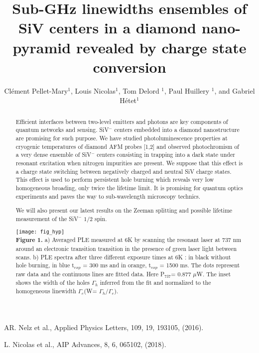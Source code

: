 \documentclass[aps,twocolumn,showpacs]{revtex4-1}
\begin{document}
\title{Sub-GHz linewidths ensembles of SiV centers in a diamond nano-pyramid revealed by charge state conversion}

\author{Cl{\'e}ment Pellet-Mary$^1$, Louis Nicolas$^1$, Tom Delord $^1$, Paul Huillery $^1$, and Gabriel H{\'e}tet$^{1}$}

\begin{abstract}
\normalsize
\noindent
Efficient interfaces between two-level emitters and photons are key components of quantum networks and sensing. %
SiV$^-$ centers embedded into a diamond nanostructure are promising for such purpose. We have studied photoluminescence properties at cryogenic temperatures of diamond AFM probes [1,2] and observed photochromism of a very dense ensemble of SiV$^-$ centers consisting in trapping into a dark state under resonant excitation when nitrogen impurities are present. We suppose that this effect is a charge state switching between negatively charged and neutral SiV charge states.  This effect is used to perform persistent hole burning which reveals very low homogeneous broading, only twice the lifetime limit. It is promising  for quantum optics experiments and paves the way to sub-wavelength microscopy technics. %

We will also present our latest results on the Zeeman splitting and possible lifetime measurement of the SiV$^-$ $1/2$ spin.

\texttt{[image: fig\_hyp]}\\
\noindent\textbf{Figure 1.} a) Averaged PLE measured at 6K by scanning the resonant laser at 737 nm around an electronic transition transition in the presence of green laser light between scans. b) PLE spectra after three different exposure times at 6K : in black without hole burning, in blue t$_{exp}$ = 300 ms and in orange, t$_{exp}$ = 1500 ms. The dots represent raw data and the continuous lines are fitted data. Here P$_{737}$= 0.877 $\mu$W. The inset shows the width of the holes $\Gamma_h$ inferred from the fit and normalized to the homogeneous linewidth $\Gamma_e$(W= $\Gamma_h/\Gamma_e$).

\end{abstract}

\maketitle



\begin{thebibliography}{}

 AR. Nelz et al., Applied Physics Letters, 109, 19, 193105, (2016).

 L. Nicolas et al., AIP Advances, 8, 6, 065102, (2018).

\end{thebibliography}
\end{document}
